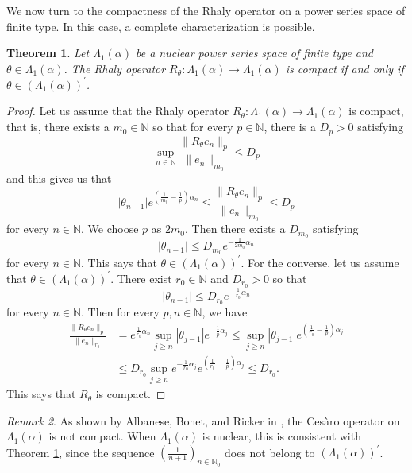 \documentclass{birkjour}
\newtheorem{thm}{Theorem}[section]
\theoremstyle{definition}
\theoremstyle{remark}
\newtheorem{rem}[thm]{Remark}
\numberwithin{equation}{section}
\begin{document}
We now turn to the compactness of the Rhaly operator on a power series 
space of finite type. In this case, a complete characterization is possible. 



\begin{thm}\label{Thm3} Let $\Lambda_{1}(\alpha)$ be a nuclear power series space of finite type  and $\theta\in \Lambda_{1}(\alpha)$. The Rhaly operator $R_{\theta}:\Lambda_{1}(\alpha)\to \Lambda_{1}(\alpha)$ is compact if and only if $\theta\in (\Lambda_{1}(\alpha))^{\prime}$.
\end{thm}
\begin{proof} Let us assume that the Rhaly operator $R_{\theta}:\Lambda_{1}(\alpha)\to \Lambda_{1}(\alpha)$ is compact, that is, there exists a  $m_{0}\in \mathbb{N}$ so that for every $p\in \mathbb{N}$, there is a $D_{p}>0$ satisfying
$$\sup_{n\in \mathbb{N}}\frac{\|R_{\theta}e_{n}\|_{p}}{\|e_{n}\|_{m_{0}}}\leq D_{p}$$
and this gives us that
$$|\theta_{n-1}|e^{\left(\frac{1}{m_0} -\frac{1}{p}\right)\alpha_{n}}\leq \frac{\|R_{\theta}e_{n}\|_{p}}{\|e_{n}\|_{m_{0}}}\leq D_{p}$$
for every $n\in \mathbb{N}$. We choose $p$ as $2m_0$. Then there exists a $D_{m_0}$ satisfying
$$|\theta_{n-1}|
\leq D_{m_0} e^{-\frac{1}{2m_0}\alpha_{n}}$$
for every $n\in \mathbb{N}$. This says that $\theta\in (\Lambda_{1}(\alpha))^{\prime}$. For the converse, let us assume that $\theta\in (\Lambda_{1}(\alpha))^{\prime}$. There exist $r_{0}\in \mathbb{N}$ and  $D_{r_{0}}>0$ so that
$$|\theta_{n-1}|\leq D_{r_{0}}e^{-\frac{1}{r_0}\alpha_{n}}$$
for every $n\in \mathbb{N}$. Then for every $p,n\in \mathbb{N}$, we have
\begin{equation*}
\begin{split}
\frac{\|R_{\theta}e_{n}\|_{p}}{\|e_{n}\|_{r_{0}}}&=e^{\frac{1}{r_{0}}\alpha_{n}} \sup_{j\geq n} |\theta_{j-1}| e^{-\frac{1}{p}\alpha_{j}} \leq  \sup_{j\geq n} |\theta_{j-1}| e^{(\frac{1}{r_0} -\frac{1}{p})\alpha_{j}} 
\\ & \leq D_{r_{0}} \sup_{j\geq n} e^{-\frac{1}{r_0} \alpha_{j}} e^{(\frac{1}{r_0} -\frac{1}{p})\alpha_{j}} \leq D_{r_{0}}.
\end{split}
\end{equation*}
This says that $R_{\theta}$ is compact.
\end{proof}

\begin{rem}
As shown by Albanese, Bonet, and Ricker in \cite[Proposition 2.5]{ABR7}, 
the Ces\`{a}ro operator on $\Lambda_{1}(\alpha)$ is not compact. When 
$\Lambda_{1}(\alpha)$ is nuclear, this is consistent with 
Theorem \ref{Thm3}, since the sequence 
$\left(\frac{1}{n+1}\right)_{n\in\mathbb{N}_{0}}$ does not belong to 
$(\Lambda_{1}(\alpha))^{\prime}$.
\end{rem}
\end{document}
